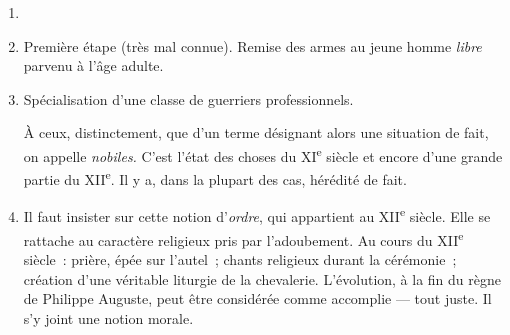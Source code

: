 \documentclass[french,twoside]{book} %
\newlength{\listmod}
\newcommand{\listhead}[1]{\hspace{-1\listmod}\emph{#1}}
\begin{document}
\begin{enumerate}[itemsep=\baselineskip,]
\item  
{}

 
\item Première étape (très mal connue). Remise des armes au jeune homme {\itshape libre} parvenu à l’âge adulte.
\item  Spécialisation d’une classe de guerriers professionnels.\par
 

 À ceux, distinctement, que d’un terme désignant alors une situation de fait, on appelle {\itshape nobiles.} C’est l’état des choses du XI\textsuperscript{e} siècle et encore d’une grande partie du XII\textsuperscript{e}. Il y a, dans la plupart des cas, hérédité de fait.\par
\label{p64} 

 
\item  Il faut insister sur cette notion d’{\itshape ordre}, qui appartient au XII\textsuperscript{e} siècle. Elle se rattache au caractère religieux pris par l’adoubement. Au cours du XII\textsuperscript{e} siècle : prière, épée sur l’autel ; chants religieux durant la cérémonie ; création d’une véritable liturgie de la chevalerie. L’évolution, à la fin du règne de Philippe Auguste, peut être considérée comme accomplie — tout juste. Il s’y joint une notion morale.\par
 

\end{enumerate}
\end{document}
